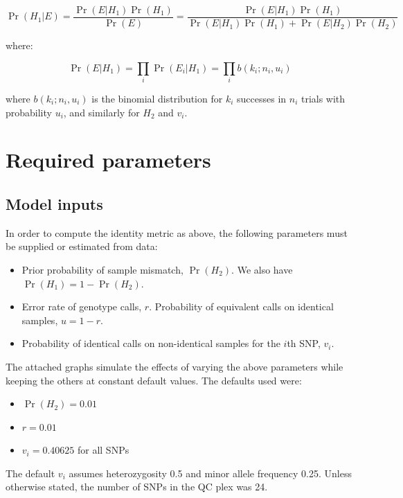 \documentclass{article}
\begin{document}
\begin{displaymath}
\Pr(H_1|E) = \frac{\Pr(E|H_1)\Pr(H_1)}{\Pr(E)}
= \frac{\Pr(E|H_1)\Pr(H_1)}{\Pr(E|H_{1})\Pr(H_{1}) + \Pr(E|H_{2})\Pr(H_{2})}
\end{displaymath}

where:

\begin{displaymath}
\Pr(E|H_1) = \prod_{i} \Pr(E_{i}|H_1)
= \prod_{i} b(k_i; n_i,u_i)
\end{displaymath}

where $b(k_i; n_i, u_i)$ is the binomial distribution for $k_i$ successes in $n_i$ trials with probability $u_i$, and similarly for $H_2$ and $v_i$.

\section{Required parameters}

\subsection*{Model inputs}

In order to compute the identity metric as above, the following parameters must be supplied or estimated from data:

\begin{itemize}
\item Prior probability of sample mismatch, $\Pr(H_2)$. We also have $\Pr(H_1) = 1 - \Pr(H_2)$.
\item Error rate of genotype calls, $r$. Probability of equivalent calls on identical samples, $u = 1 - r$.
\item Probability of identical calls on non-identical samples for the $i$th SNP, $v_i$.
\end{itemize}

The attached graphs simulate the effects of varying the above parameters while keeping the others at constant default values. The defaults used were:

\begin{itemize}
\item $\Pr(H_2) = 0.01$
\item $r = 0.01$
\item $v_i = 0.40625$ for all SNPs
\end{itemize}

The default $v_i$ assumes heterozygosity 0.5 and minor allele frequency 0.25. Unless otherwise stated, the number of SNPs in the QC plex was 24.
\end{document}
